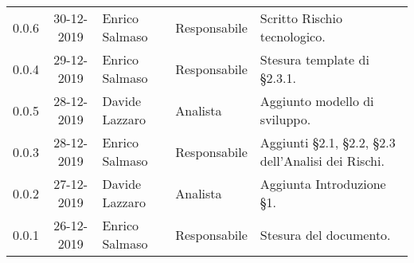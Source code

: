 {\begin{longtable}{ c c  C{4cm}  C{3cm} C{4cm}}
0.0.6 & 30-12-2019 & Enrico Salmaso & Responsabile & Scritto Rischio tecnologico. \\
0.0.4 & 29-12-2019 & Enrico Salmaso & Responsabile & Stesura template di §2.3.1.\\
0.0.5 & 28-12-2019 & Davide Lazzaro & Analista & Aggiunto modello di sviluppo.\\
0.0.3 & 28-12-2019 & Enrico Salmaso & Responsabile & Aggiunti §2.1, §2.2, §2.3 dell'Analisi dei Rischi. \\
0.0.2 & 27-12-2019 & Davide Lazzaro & Analista & Aggiunta Introduzione §1. \\
0.0.1 & 26-12-2019 & Enrico Salmaso & Responsabile & Stesura del documento.  \\
		
\end{longtable}
}